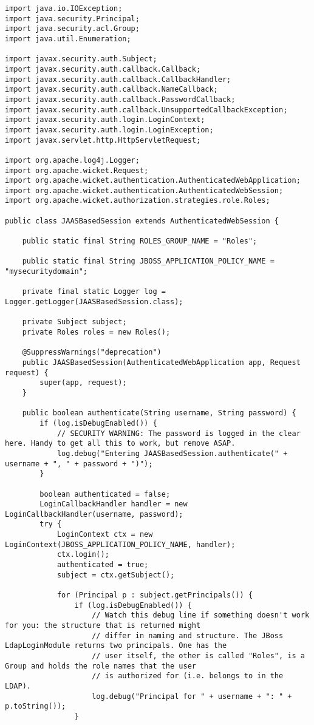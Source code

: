 \begin{enumerate}
\begin{lstlisting}
import java.io.IOException;
import java.security.Principal;
import java.security.acl.Group;
import java.util.Enumeration;

import javax.security.auth.Subject;
import javax.security.auth.callback.Callback;
import javax.security.auth.callback.CallbackHandler;
import javax.security.auth.callback.NameCallback;
import javax.security.auth.callback.PasswordCallback;
import javax.security.auth.callback.UnsupportedCallbackException;
import javax.security.auth.login.LoginContext;
import javax.security.auth.login.LoginException;
import javax.servlet.http.HttpServletRequest;

import org.apache.log4j.Logger;
import org.apache.wicket.Request;
import org.apache.wicket.authentication.AuthenticatedWebApplication;
import org.apache.wicket.authentication.AuthenticatedWebSession;
import org.apache.wicket.authorization.strategies.role.Roles;

public class JAASBasedSession extends AuthenticatedWebSession {
	
	public static final String ROLES_GROUP_NAME = "Roles";

	public static final String JBOSS_APPLICATION_POLICY_NAME = "mysecuritydomain";

	private final static Logger log = Logger.getLogger(JAASBasedSession.class);
	
	private Subject subject;
	private Roles roles = new Roles();
	
    @SuppressWarnings("deprecation")
	public JAASBasedSession(AuthenticatedWebApplication app, Request request) {
        super(app, request);
    }

    public boolean authenticate(String username, String password) {
    	if (log.isDebugEnabled()) {
			// SECURITY WARNING: The password is logged in the clear here. Handy to get all this to work, but remove ASAP.
    		log.debug("Entering JAASBasedSession.authenticate(" + username + ", " + password + ")");
    	}

    	boolean authenticated = false;
    	LoginCallbackHandler handler = new LoginCallbackHandler(username, password);
    	try {
    		LoginContext ctx = new LoginContext(JBOSS_APPLICATION_POLICY_NAME, handler);
			ctx.login();
			authenticated = true;
			subject = ctx.getSubject();
			
			for (Principal p : subject.getPrincipals()) {
				if (log.isDebugEnabled()) {
					// Watch this debug line if something doesn't work for you: the structure that is returned might
					// differ in naming and structure. The JBoss LdapLoginModule returns two principals. One has the
					// user itself, the other is called "Roles", is a Group and holds the role names that the user
					// is authorized for (i.e. belongs to in the LDAP).
					log.debug("Principal for " + username + ": " + p.toString());
				}
				

\end{lstlisting}
\end{enumerate}
